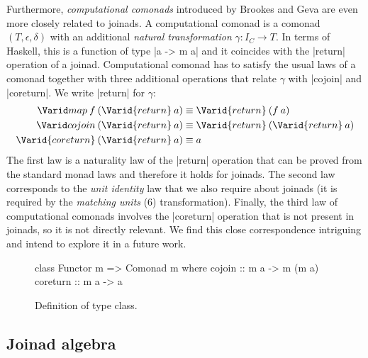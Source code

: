 \documentclass{sigplanconf}
\begin{document}
Furthermore, \emph{computational comonads} introduced by Brookes and Geva \cite{comp-comonads} 
are even more closely related to joinads. A computational comonad is a comonad $(T, \epsilon, \delta)$
with an additional \emph{natural transformation} $\gamma : I_C \rightarrow T$. In terms of Haskell, this
is a function of type |a -> m a| and it coincides with the |return| operation of a joinad. 
Computational comonad has to satisfy the usual laws of a comonad together with three additional
operations that relate $\gamma$ with |cojoin| and |coreturn|. We write |return| 
for $\gamma$:
\begin{align*}
\map \: f \: (\Varid{return} \: a) &\equiv \Varid{return} \: (f \: a) \\
\mcojoin \: (\Varid{return} \: a) &\equiv \Varid{return} \: (\Varid{return} \: a)\\
\Varid{coreturn} \: (\Varid{return} \: a) &\equiv a 
\end{align*}
The first law is a naturality law of the |return| operation that can be proved from the standard 
monad laws and therefore it holds for joinads. The second law corresponds to the \emph{unit identity}
law that we also require about joinads (it is required by the \textit{matching units} (6) 
transformation). Finally, the third law of computational comonads involves the |coreturn| operation
that is not present in joinads, so it is not directly relevant. We find this close correspondence
intriguing and intend to explore it in a future work.

\begin{figure}
\begin{code}
class Functor m => Comonad m where
  cojoin :: m a -> m (m a)
  coreturn :: m a -> a
\end{code}
\caption{Definition of  type class. }
\label{fig:comonad-class}
\end{figure}


\subsection{Joinad algebra} 
\label{sec:theory-algebra}
\end{document}
